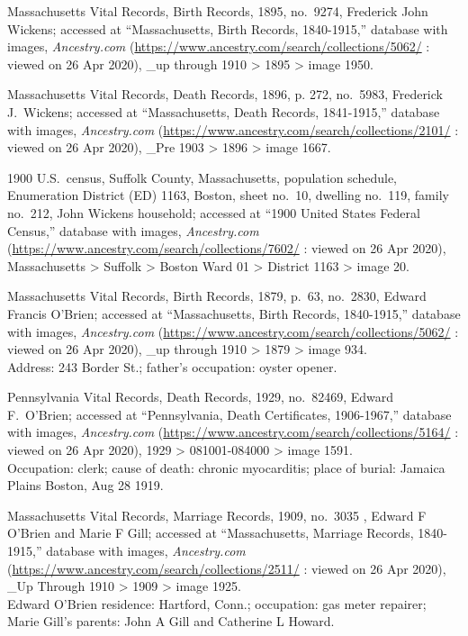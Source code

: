 \begin{thebibliography}{999}
	Massachusetts Vital Records, Birth Records, 1895, no.\ 9274, Frederick John Wickens; accessed at ``Massachusetts, Birth Records, 1840-1915,'' database with images, \textit{Ancestry.com} (\url{https://www.ancestry.com/search/collections/5062/} : viewed on 26 Apr 2020), \_up through 1910 > 1895 > image 1950.
	
	Massachusetts Vital Records, Death Records, 1896, p. 272, no.\ 5983, Frederick J.\ Wickens; accessed at ``Massachusetts, Death Records, 1841-1915,'' database with images, \textit{Ancestry.com} (\url{https://www.ancestry.com/search/collections/2101/} : viewed on 26 Apr 2020), \_Pre 1903 > 1896 > image 1667.
	
	1900 U.S.\ census, Suffolk County, Massachusetts, population schedule, Enumeration District (ED) 1163,  Boston, sheet no.\ 10, dwelling no.\ 119, family no.\ 212, John Wickens household; accessed at ``1900 United States Federal Census,'' database with images, \textit{Ancestry.com} (\url{https://www.ancestry.com/search/collections/7602/} : viewed on 26 Apr 2020), Massachusetts > Suffolk > Boston Ward 01 > District 1163 > image 20.
	
	Massachusetts Vital Records, Birth Records, 1879, p.\ 63, no.\ 2830, Edward Francis O'Brien; accessed at ``Massachusetts, Birth Records, 1840-1915,'' database with images, \textit{Ancestry.com} (\url{https://www.ancestry.com/search/collections/5062/} : viewed on 26 Apr 2020), \_up through 1910 > 1879 > image 934.\\
	Address: 243 Border St.; father's occupation: oyster opener.
	
	Pennsylvania Vital Records, Death Records, 1929, no.\ 82469, Edward F.\ O'Brien; accessed at ``Pennsylvania, Death Certificates, 1906-1967,'' database with images, \textit{Ancestry.com} (\url{https://www.ancestry.com/search/collections/5164/} : viewed on 26 Apr 2020), 1929 > 081001-084000 > image 1591.\\
	Occupation: clerk; cause of death: chronic myocarditis; place of burial: Jamaica Plains Boston, Aug 28 1919.
	
	Massachusetts Vital Records, Marriage Records, 1909, no.\ 3035 , Edward F O'Brien and Marie F Gill; accessed at ``Massachusetts, Marriage Records, 1840-1915,'' database with images, \textit{Ancestry.com} (\url{https://www.ancestry.com/search/collections/2511/} : viewed on 26 Apr 2020), \_Up Through 1910 > 1909 > image 1925.\\
	Edward O'Brien residence: Hartford, Conn.; occupation: gas meter repairer; Marie Gill's parents: John A Gill and Catherine L Howard.
	

\end{thebibliography}
